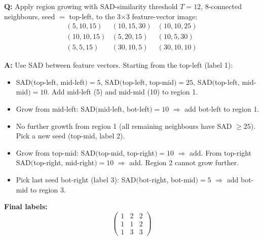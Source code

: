 \begin{exbox}
\textbf{Q:} Apply region growing with SAD-similarity threshold $T = 12$, 8-connected neighbours, seed $=$ top-left, to the 3$\times$3 feature-vector image:
\[
\begin{matrix} (5,10,15) & (10,15,30) & (10,10,25) \\ (10,10,15) & (5,20,15) & (10,5,30) \\ (5,5,15) & (30,10,5) & (30,10,10) \end{matrix}
\]

\textbf{A:} Use SAD between feature vectors. Starting from the top-left (label 1):
\begin{itemize}
  \item SAD$($top-left, mid-left$) = 5$, SAD$($top-left, top-mid$) = 25$, SAD$($top-left, mid-mid$) = 10$. Add mid-left (5) and mid-mid (10) to region 1.
  \item Grow from mid-left: SAD$($mid-left, bot-left$) = 10$ $\Rightarrow$ add bot-left to region 1.
  \item No further growth from region 1 (all remaining neighbours have SAD $\geq 25$). Pick a new seed (top-mid, label 2).
  \item Grow from top-mid: SAD$($top-mid, top-right$) = 10$ $\Rightarrow$ add. From top-right SAD$($top-right, mid-right$) = 10$ $\Rightarrow$ add. Region 2 cannot grow further.
  \item Pick last seed bot-right (label 3): SAD$($bot-right, bot-mid$) = 5$ $\Rightarrow$ add bot-mid to region 3.
\end{itemize}
\textbf{Final labels:}
\[
\begin{pmatrix} 1 & 2 & 2 \\ 1 & 1 & 2 \\ 1 & 3 & 3 \end{pmatrix}
\]
\end{exbox}

